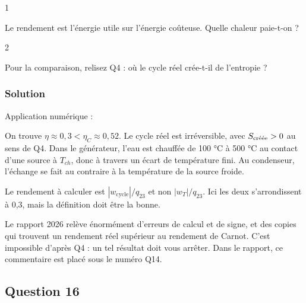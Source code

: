 \documentclass[11pt,a4paper]{article}
\newcommand{\equationajustee}[1]{%
  \sbox{\boiteequation}{$\displaystyle #1$}%
  \ifdim\wd\boiteequation>\linewidth
    \[\resizebox{\linewidth}{!}{\usebox{\boiteequation}}\]%
  \else
    \[#1\]%
  \fi}
\begin{document}
\begin{indication}{1}

Le rendement est l'énergie utile sur l'énergie coûteuse. Quelle chaleur paie-t-on ?

\end{indication}

\begin{indication}{2}

Pour la comparaison, relisez Q4 : où le cycle réel crée-t-il de l'entropie ?

\end{indication}

\hypertarget{solution-14}{%
\subsubsection{Solution}\label{solution-14}}

\equationajustee{\eta=\frac{-w_{\text{cycle}}}{q_{23}}}

Application numérique :
\equationajustee{\eta\approx\frac{875}{2985}\approx0{,}29}

\equationajustee{\boxed{\eta\approx0{,}3}}

On trouve \(\eta\approx0{,}3<\eta_C\approx0{,}52\). Le cycle réel est irréversible, avec \(S_{\text{\text{créée}}}>0\) au sens de Q4. Dans le générateur, l'eau est chauffée de 100 °C à 500 °C au contact d'une source à \(T_{ch}\), donc à travers un écart de température fini. Au condenseur, l'échange se fait au contraire à la température de la source froide.

\begin{piege}

Le rendement à calculer est \(|w_{\text{cycle}}|/q_{23}\) et non \(|w_T|/q_{23}\). Ici les deux s'arrondissent à 0,3, mais la définition doit être la bonne.

\end{piege}

\begin{piege}

Le rapport 2026 relève énormément d'erreurs de calcul et de signe, et des copies qui trouvent un rendement réel supérieur au rendement de Carnot. C'est impossible d'après Q4 : un tel résultat doit vous arrêter. Dans le rapport, ce commentaire est placé sous le numéro Q14.

\end{piege}

\hypertarget{question-16}{%
\subsection{Question 16}\label{question-16}}
\end{document}
